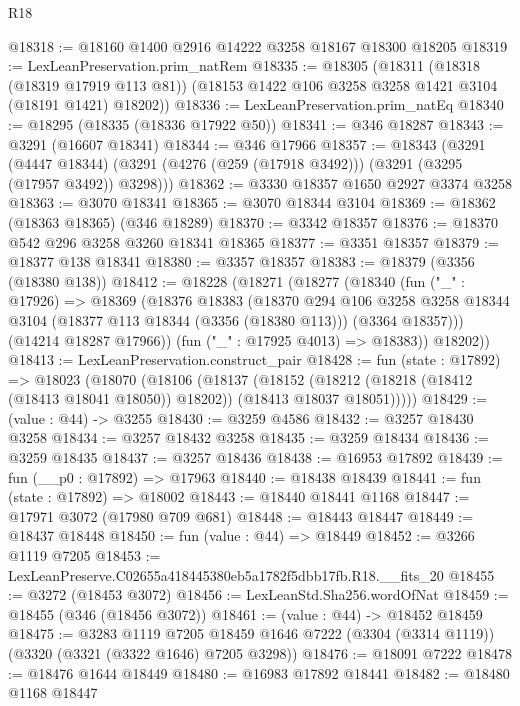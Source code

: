 \begin{lexlean}{R18}
\begin{coremodule}
@18318 := @18160 @1400 @2916 @14222 @3258 @18167 @18300 @18205
@18319 := LexLeanPreservation.prim_natRem
@18335 := @18305
    (@18311
      (@18318 (@18319 @17919 @113 @81))
      (@18153 @1422 @106 @3258 @3258 @1421 @3104 (@18191 @1421) @18202))
@18336 := LexLeanPreservation.prim_natEq
@18340 := @18295 (@18335 (@18336 @17922 @50))
@18341 := @346 @18287
@18343 := @3291 (@16607 @18341)
@18344 := @346 @17966
@18357 := @18343
    (@3291
      (@4447 @18344)
      (@3291 (@4276 (@259 (@17918 @3492))) (@3291 (@3295 (@17957 @3492)) @3298)))
@18362 := @3330 @18357 @1650 @2927 @3374 @3258
@18363 := @3070 @18341
@18365 := @3070 @18344 @3104
@18369 := @18362 (@18363 @18365) (@346 @18289)
@18370 := @3342 @18357
@18376 := @18370 @542 @296 @3258 @3260 @18341 @18365
@18377 := @3351 @18357
@18379 := @18377 @138 @18341
@18380 := @3357 @18357
@18383 := @18379 (@3356 (@18380 @138))
@18412 := @18228
    (@18271
      (@18277
        (@18340
          (fun ("_" : @17926) =>
          @18369
            (@18376
              @18383
              (@18370
                @294
                @106
                @3258
                @3258
                @18344
                @3104
                (@18377 @113 @18344 (@3356 (@18380 @113)))
                (@3364 @18357)))
            (@14214 @18287 @17966))
          (fun ("_" : @17925 @4013) => @18383))
        @18202))
@18413 := LexLeanPreservation.construct_pair
@18428 := fun (state : @17892) =>
  @18023
    (@18070
      (@18106
        (@18137
          (@18152
            (@18212 (@18218 (@18412 (@18413 @18041 @18050)) @18202))
            (@18413 @18037 @18051)))))
@18429 := (value : @44) -> @3255
@18430 := @3259 @4586
@18432 := @3257 @18430 @3258
@18434 := @3257 @18432 @3258
@18435 := @3259 @18434
@18436 := @3259 @18435
@18437 := @3257 @18436
@18438 := @16953 @17892
@18439 := fun (__p0 : @17892) => @17963
@18440 := @18438 @18439
@18441 := fun (state : @17892) => @18002
@18443 := @18440 @18441 @1168
@18447 := @17971 @3072 (@17980 @709 @681)
@18448 := @18443 @18447
@18449 := @18437 @18448
@18450 := fun (value : @44) => @18449
@18452 := @3266 @1119 @7205
@18453 := LexLeanPreserve.C02655a418445380eb5a1782f5dbb17fb.R18.__fits_20
@18455 := @3272 (@18453 @3072)
@18456 := LexLeanStd.Sha256.wordOfNat
@18459 := @18455 (@346 (@18456 @3072))
@18461 := (value : @44) -> @18452 @18459
@18475 := @3283
    @1119
    @7205
    @18459
    @1646
    @7222
    (@3304 (@3314 @1119))
    (@3320 (@3321 (@3322 @1646) @7205 @3298))
@18476 := @18091 @7222
@18478 := @18476 @1644 @18449
@18480 := @16983 @17892 @18441
@18482 := @18480 @1168 @18447

\end{coremodule}
\end{lexlean}
